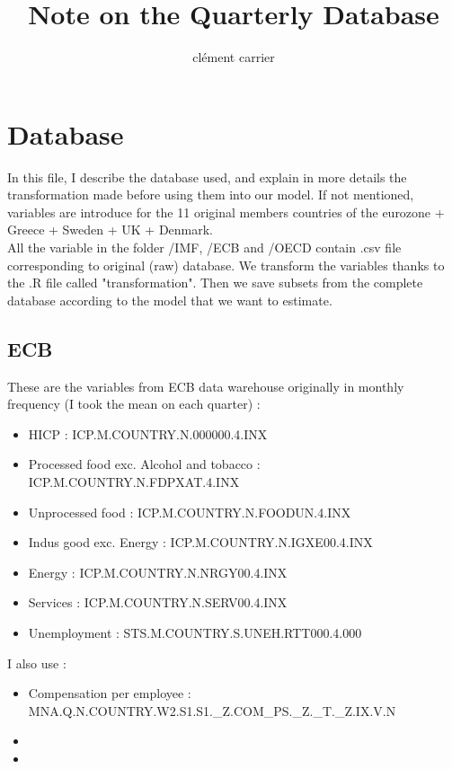 \documentclass[11pt,a4paper]{article}
\title{Note on the Quarterly Database}
\author{clément carrier}
\begin{document}
\maketitle

\section{Database}

In this file, I describe the database used, and explain in more details the transformation made before using them into our model. If not mentioned, variables are introduce for the 11 original members countries of the eurozone + Greece + Sweden + UK + Denmark.\\

All the variable in the folder /IMF, /ECB and /OECD contain .csv file corresponding to original (raw) database. We transform the variables thanks to the .R file called "transformation". Then we save subsets from the complete database according to the model that we want to estimate. 




\subsection{ECB}

These are the variables from ECB data warehouse originally in monthly frequency (I took the mean on each quarter) : 
\begin{itemize}
\item HICP : ICP.M.COUNTRY.N.000000.4.INX
\item Processed food exc. Alcohol and tobacco : ICP.M.COUNTRY.N.FDPXAT.4.INX
\item Unprocessed food	: ICP.M.COUNTRY.N.FOODUN.4.INX
\item Indus good exc. Energy : ICP.M.COUNTRY.N.IGXE00.4.INX
\item Energy	:	ICP.M.COUNTRY.N.NRGY00.4.INX
\item Services	:	ICP.M.COUNTRY.N.SERV00.4.INX
\item Unemployment : STS.M.COUNTRY.S.UNEH.RTT000.4.000
\end{itemize}

\vspace{0.5cm}

I also use : 

\begin{itemize}
\item Compensation per employee : MNA.Q.N.COUNTRY.W2.S1.S1._Z.COM_PS._Z._T._Z.IX.V.N
\item 
\item 
\end{itemize}
\end{document}

